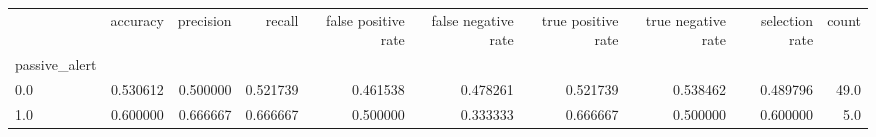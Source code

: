 \begin{tabular}{lrrrrrrrrr}
\toprule
{} &  accuracy &  precision &    recall &  false positive rate &  false negative rate &  true positive rate &  true negative rate &  selection rate &  count \\
passive\_alert &           &            &           &                      &                      &                     &                     &                 &        \\
\midrule
0.0           &  0.530612 &   0.500000 &  0.521739 &             0.461538 &             0.478261 &            0.521739 &            0.538462 &        0.489796 &   49.0 \\
1.0           &  0.600000 &   0.666667 &  0.666667 &             0.500000 &             0.333333 &            0.666667 &            0.500000 &        0.600000 &    5.0 \\
\bottomrule
\end{tabular}
